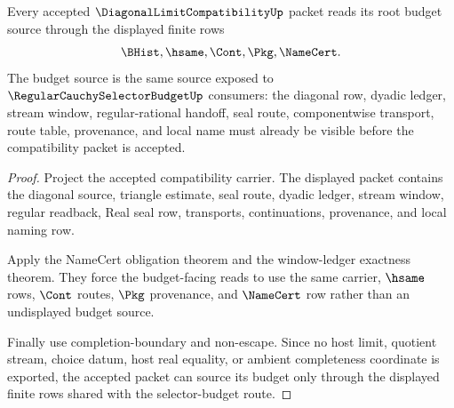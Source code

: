 \begin{theorem}
\label{thm:diagonal-limit-compatibility-root-budget-source}
Every accepted $\DiagonalLimitCompatibilityUp$ packet reads its root budget
source through the displayed finite rows
$$
\BHist,\hsame,\Cont,\Pkg,\NameCert.
$$
The budget source is the same source exposed to
$\RegularCauchySelectorBudgetUp$ consumers: the diagonal row, dyadic ledger,
stream window, regular-rational handoff, seal route, componentwise transport,
route table, provenance, and local name must already be visible before the
compatibility packet is accepted.
\end{theorem}
\begin{proof}
Project the accepted compatibility carrier. The displayed packet contains the
diagonal source, triangle estimate, seal route, dyadic ledger, stream window,
regular readback, Real seal row, transports, continuations, provenance, and
local naming row.

Apply the NameCert obligation theorem and the window-ledger exactness theorem.
They force the budget-facing reads to use the same carrier, $\hsame$ rows,
$\Cont$ routes, $\Pkg$ provenance, and $\NameCert$ row rather than an
undisplayed budget source.

Finally use completion-boundary and non-escape. Since no host limit, quotient
stream, choice datum, host real equality, or ambient completeness coordinate is
exported, the accepted packet can source its budget only through the displayed
finite rows shared with the selector-budget route.
\end{proof}

